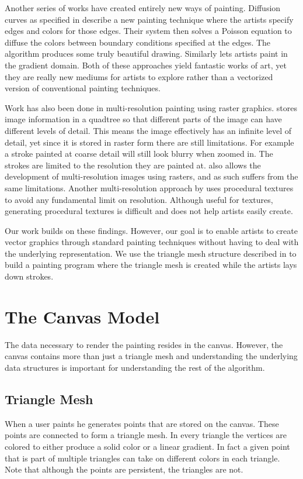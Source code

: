 \documentclass[conference]{acmsiggraph}
\begin{document}
Another series of works have created entirely new ways of painting. Diffusion curves as specified in \cite{Orzan:2008:DCV:1360612.1360691}
describe a new painting technique where the artists specify edges and colors for those edges. Their system
then solves a Poisson equation to diffuse the colors between boundary conditions specified at the edges.
The algorithm produces some truly beautiful drawing. Similarly \cite{McCann:2008:RGP:1360612.1360692}
lets artists paint in the gradient domain. Both of these approaches yield fantastic works of art, yet
they are really new mediums for artists to explore rather than a vectorized version of conventional
painting techniques.

Work has also been done in multi-resolution painting using raster graphics. \cite{Berman:1994:MPC:192161.192181}
stores image information in a quadtree so that different parts of the image can have different levels of detail.
This means the image effectively has an infinite level of detail, yet since it is stored in raster form
there are still limitations. For example a stroke painted at coarse detail will still look blurry when
zoomed in. The strokes are limited to the resolution they are painted at. \cite{Carr:2004:PD:1186562.1015809}
also allows the development of multi-resolution images using rasters, and as such suffers from the
same limitations. Another multi-resolution approach by \cite{Perlin:1995:LPP:218380.218437} uses
procedural textures to avoid any fundamental limit on resolution. Although useful for textures,
generating procedural textures is difficult and does not help artists easily create.

Our work builds on these findings. However, our goal is to enable artists to create vector
graphics through standard painting techniques without having to deal with the underlying representation.
We use the triangle mesh structure described in \cite{10.1109/TVCG.2012.76} to build a painting program
where the triangle mesh is created while the artists lays down strokes. 

\section{The Canvas Model}
The data necessary to render the painting resides in the canvas. However, the canvas contains more than just
a triangle mesh and understanding the underlying data structures is important for 
understanding the rest of the algorithm.

\subsection{Triangle Mesh}
When a user paints he generates points that are stored on the canvas. These points are
connected to form a triangle mesh. In every triangle the vertices are colored to either
produce a solid color or a linear gradient. In fact a given point that is part of
multiple triangles can take on different colors in each triangle. Note that although
the points are persistent, the triangles are not.
\end{document}
